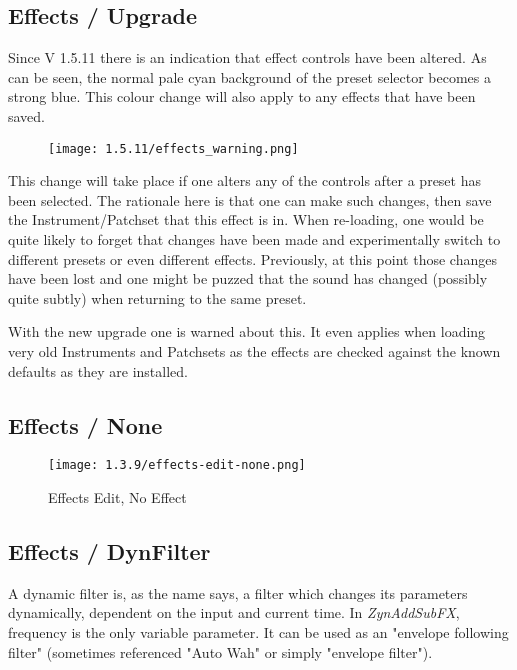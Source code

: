 \subsection{Effects / Upgrade}
\label{subsec:effects_upgrade}
   Since V 1.5.11 there is an indication that effect controls have been altered. As can
   be seen, the normal pale cyan background of the preset selector becomes a strong blue.
   This colour change will also apply to any effects that have been saved.
   \begin{figure}[H]
   \centering
   \texttt{[image: 1.5.11/effects\_warning.png]}
   \label{fig:effects_warning}
\end{figure}

   This change will take place if one alters any of the controls after a preset has been
   selected. The rationale here is that one can make such changes, then save the
   Instrument/Patchset that this effect is in.
   When re-loading, one would be quite likely to forget that changes have been made and
   experimentally switch to different presets or even different effects.
   Previously, at this point those changes have been lost and one might be puzzed that
   the sound has changed (possibly quite subtly) when returning to the same preset.

   With the new upgrade one is warned about this. It even applies when loading very old
   Instruments and Patchsets as the effects are checked against the known defaults as
   they are installed.

\subsection{Effects / None}
\label{subsec:effects_edit_none}

\begin{figure}[H]
   \centering
   \texttt{[image: 1.3.9/effects-edit-none.png]}
   \caption{Effects Edit, No Effect}
   \label{fig:effects_edit_none}
\end{figure}

\subsection{Effects / DynFilter}
\label{subsec:effects_edit_dynfilter}

   A dynamic filter is, as the name says, a filter which changes its
   parameters dynamically, dependent on the input and current time. In
   \textsl{ZynAddSubFX}, frequency is the only variable parameter. It can be
   used as an "envelope following filter" (sometimes referenced "Auto Wah" or
   simply "envelope filter").

